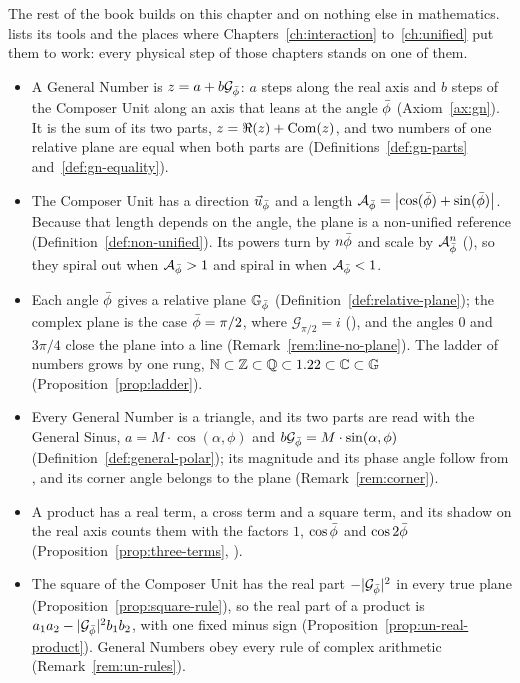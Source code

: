 The rest of the book builds on this chapter and on nothing else in mathematics.  lists its tools and the places where Chapters~\ref{ch:interaction} to~\ref{ch:unified} put them to work: every physical step of those chapters stands on one of them.


\begin{plainwords}
\begin{itemize}
  \item A General Number is $z = a + b\mathcal{G}_{\bar{\phi}}$: $a$ steps along the real axis and $b$ steps of the Composer Unit along an axis that leans at the angle $\bar{\phi}$ (Axiom~\ref{ax:gn}). It is the sum of its two parts, $z = \Re(z) + \operatorname{Com}(z)$, and two numbers of one relative plane are equal when both parts are (Definitions~\ref{def:gn-parts} and~\ref{def:gn-equality}).
  \item The Composer Unit has a direction $\vec{u}_{\bar{\phi}}$ and a length $\mathcal{A}_{\bar{\phi}} = \left| \cos(\bar{\phi}) + \sin(\bar{\phi}) \right|$. Because that length depends on the angle, the plane is a non-unified reference (Definition~\ref{def:non-unified}). Its powers turn by $n\bar{\phi}$ and scale by $\mathcal{A}_{\bar{\phi}}^n$ (), so they spiral out when $\mathcal{A}_{\bar{\phi}} > 1$ and spiral in when $\mathcal{A}_{\bar{\phi}} < 1$.
  \item Each angle $\bar{\phi}$ gives a relative plane $\mathbb{G}_{\bar{\phi}}$ (Definition~\ref{def:relative-plane}); the complex plane is the case $\bar{\phi} = \pi/2$, where $\mathcal{G}_{\pi/2} = i$ (), and the angles $0$ and $3\pi/4$ close the plane into a line (Remark~\ref{rem:line-no-plane}). The ladder of numbers grows by one rung, $\mathbb{N} \subset \mathbb{Z} \subset \mathbb{Q} \subset 1.22 \subset \mathbb{C} \subset \mathbb{G}$ (Proposition~\ref{prop:ladder}).
  \item Every General Number is a triangle, and its two parts are read with the General Sinus, $a = M \cdot \cos(\alpha, \phi)$ and $b\mathcal{G}_{\bar{\phi}} = M \cdot \sin(\alpha, \phi)$ (Definition~\ref{def:general-polar}); its magnitude and its phase angle follow from , and its corner angle belongs to the plane (Remark~\ref{rem:corner}).
  \item A product has a real term, a cross term and a square term, and its shadow on the real axis counts them with the factors $1$, $\cos\bar{\phi}$ and $\cos 2\bar{\phi}$ (Proposition~\ref{prop:three-terms}, ).
  \item The square of the Composer Unit has the real part $-|\mathcal{G}_{\bar{\phi}}|^2$ in every true plane (Proposition~\ref{prop:square-rule}), so the real part of a product is $a_1 a_2 - |\mathcal{G}_{\bar{\phi}}|^2 b_1 b_2$, with one fixed minus sign (Proposition~\ref{prop:un-real-product}). General Numbers obey every rule of complex arithmetic (Remark~\ref{rem:un-rules}).

\end{itemize}
\end{plainwords}
